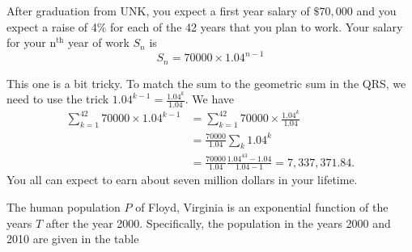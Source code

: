 \documentclass[12pt,fleqn,answers]{exam}
\begin{document}
\begin{questions}
\begin{solution}
\end{solution}
\question After graduation from UNK, you expect a first year salary of $\$70,000$
and you expect a raise of 4\% for each of the 42 years that you plan to work. Your salary
for your $\mbox{n}^{\mbox{th}}$ year of work $S_n$ is
\begin{equation*}
    S_n = 70000 \times 1.04^{n-1}
\end{equation*}

\begin{solution}[1.25in]
  This one is a bit tricky. To match the sum to the geometric sum in the QRS,
  we need to use the trick $1.04^{k-1} = \frac{1.04^k}{1.04}$. We have
  \begin{align*}
    \sum_{k=1}^{42} 70000 \times 1.04^{k-1}&=
    \sum_{k=1}^{42} 70000 \times \frac{1.04^k}{1.04}\\
    &= \frac{70000}{1.04} \sum_{k} 1.04^k\\
    &=\frac{70000}{1.04} \frac{1.04^{43} - 1.04}{1.04-1}
    =7,337,371.84.
  \end{align*}
You all can expect to earn about seven million dollars in your lifetime.
\end{solution} 

\hfil
\newpage
\question The human population $P$ of Floyd, Virginia is an exponential function of the years $T$ after the year 2000.  Specifically,
the population in the years 2000 and 2010 are given in the table


\end{questions}
\end{document}

